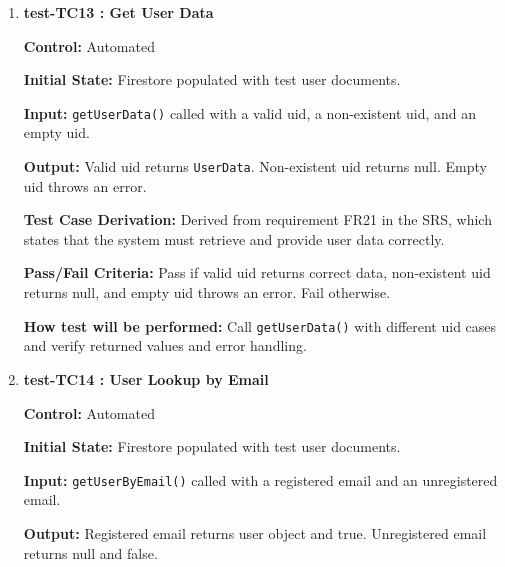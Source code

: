 \documentclass[12pt, titlepage]{article}
\begin{document}
\begin{enumerate}
	\textbf{Output:} Auth sign-out called once and completes without error.
	
	\textbf{Test Case Derivation:} Derived from requirement FR1 in the SRS, which states that users must be able to securely log out and end their session.
	
	\textbf{Pass/Fail Criteria:} Pass if the user is signed out successfully and no error occurs. Fail otherwise.
	
	\textbf{How test will be performed:} Call \texttt{logoutUser()} while a user session is active and verify that sign-out completes successfully.
	

  \vspace{0.5em}

  \item \textbf{test-TC13 : Get User Data}

  \textbf{Control:} Automated

  \textbf{Initial State:} Firestore populated with test user documents.

  \textbf{Input:} \texttt{getUserData()} called with a valid uid, a non-existent uid, and an empty uid.

  \textbf{Output:} Valid uid returns \texttt{UserData}. Non-existent uid returns null. Empty uid throws an error.

  \textbf{Test Case Derivation:} Derived from requirement FR21 in the SRS, which states that the system must retrieve and provide user data correctly.

  \textbf{Pass/Fail Criteria:} Pass if valid uid returns correct data, non-existent uid returns null, and empty uid throws an error. Fail otherwise.

  \textbf{How test will be performed:} Call \texttt{getUserData()} with different uid cases and verify returned values and error handling.


  \vspace{0.5em}

  \item \textbf{test-TC14 : User Lookup by Email}

  \textbf{Control:} Automated

  \textbf{Initial State:} Firestore populated with test user documents.

  \textbf{Input:} \texttt{getUserByEmail()} called with a registered email and an unregistered email.

  \textbf{Output:} Registered email returns user object and true. Unregistered email returns null and false.


\end{enumerate}
\end{document}
